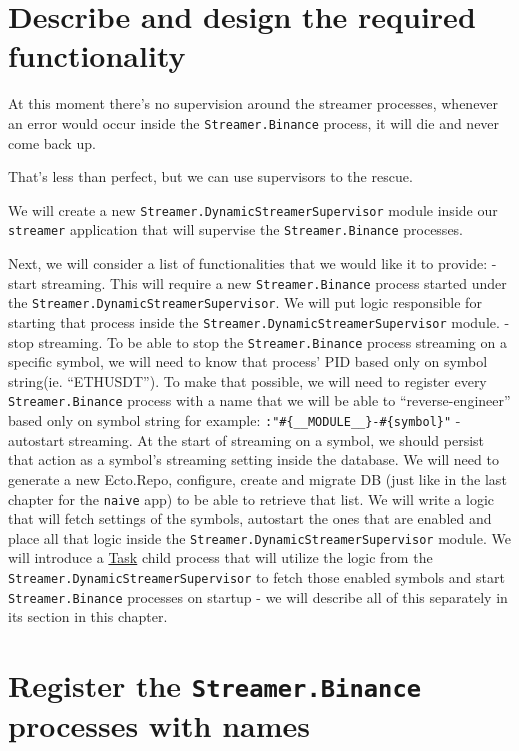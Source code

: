 \documentclass[
]{book}
\begin{document}
\hypertarget{describe-and-design-the-required-functionality-2}{%
\section{Describe and design the required functionality}\label{describe-and-design-the-required-functionality-2}}

At this moment there's no supervision around the streamer processes, whenever an error would occur inside the \texttt{Streamer.Binance} process, it will die and never come back up.

That's less than perfect, but we can use supervisors to the rescue.

We will create a new \texttt{Streamer.DynamicStreamerSupervisor} module inside our \texttt{streamer} application that will supervise the \texttt{Streamer.Binance} processes.

Next, we will consider a list of functionalities that we would like it to provide:
- start streaming. This will require a new \texttt{Streamer.Binance} process started under the
\texttt{Streamer.DynamicStreamerSupervisor}. We will put logic responsible for starting that process inside the \texttt{Streamer.DynamicStreamerSupervisor} module.
- stop streaming. To be able to stop the \texttt{Streamer.Binance} process streaming on a specific symbol, we will need to know that process' PID based only on symbol string(ie. ``ETHUSDT''). To make that possible, we will need to register every \texttt{Streamer.Binance} process with a name that we will be able to ``reverse-engineer'' based only on symbol string for example: \texttt{:"\#\{\_\_MODULE\_\_\}-\#\{symbol\}"}
- autostart streaming. At the start of streaming on a symbol, we should persist that action as a symbol's streaming setting inside the database. We will need to generate a new Ecto.Repo, configure, create and migrate DB (just like in the last chapter for the \texttt{naive} app) to be able to retrieve that list. We will write a logic that will fetch settings of the symbols, autostart the ones that are enabled and place all that logic inside the \texttt{Streamer.DynamicStreamerSupervisor} module. We will introduce a \href{https://hexdocs.pm/elixir/master/Task.html}{Task} child process that will utilize the logic from the \texttt{Streamer.DynamicStreamerSupervisor} to fetch those enabled symbols and start \texttt{Streamer.Binance} processes on startup - we will describe all of this separately in its section in this chapter.

\hypertarget{register-the-streamer.binance-processes-with-names}{%
\section{\texorpdfstring{Register the \texttt{Streamer.Binance} processes with names}{Register the Streamer.Binance processes with names}}\label{register-the-streamer.binance-processes-with-names}}
\end{document}
